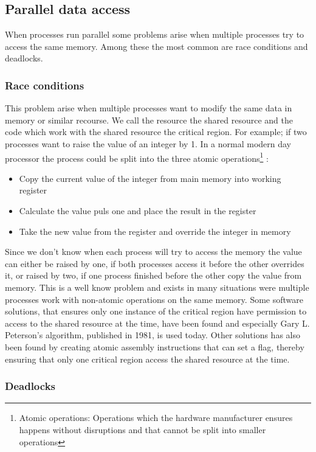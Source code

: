 \subsection{Parallel data access}
When processes run parallel some problems arise when multiple processes try to access the same memory. Among these the most common are race conditions and deadlocks.

\subsubsection{Race conditions}
This problem arise when multiple processes want to modify the same data in memory or similar recourse. We call the resource the shared resource and the code which work with the shared resource the critical region. For example; if two processes want to raise the value of an integer by 1. In a normal modern day processor the process could be split into the three atomic operations\footnote{Atomic operations: Operations which the hardware manufacturer ensures happens without disruptions and that cannot be split into smaller operations}
:
\begin{itemize}
\item Copy the current value of the integer from main memory into working register
\item Calculate the value puls one and place the result in the register
\item Take the new value from the register and override the integer in memory
\end{itemize}
Since we don't know when each process will try to access the memory the value can either be raised by one, if both processes access it before the other overrides it, or raised by two, if one process finished before the other copy the value from memory. This is a well know problem and exists in many situations were multiple processes work with non-atomic operations on the same memory. Some software solutions, that ensures only one instance of the critical region have permission to access to the shared resource at the time, have been found and especially Gary L. Peterson's algorithm, published in 1981, is used today. Other solutions has also been found by creating atomic assembly instructions that can set a flag, thereby ensuring that only one critical region access the shared resource at the time.

\subsubsection{Deadlocks}
